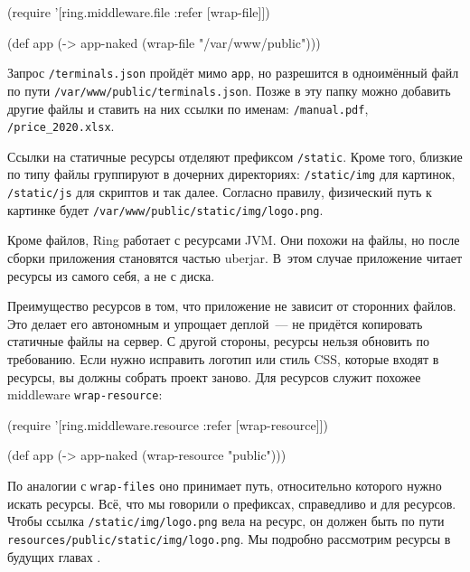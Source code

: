 \else

\begin{english}
  \begin{clojure}
(require '[ring.middleware.file :refer [wrap-file]])

(def app (-> app-naked
             (wrap-file "/var/www/public")))
  \end{clojure}
\end{english}

\fi

Запрос \verb|/terminals.json| пройдёт мимо \verb|app|, но разрешится в
одноимённый файл по пути \verb|/var/www/public/terminals.json|. Позже в эту
папку можно добавить другие файлы и ставить на них ссылки по именам:
\verb|/manual.pdf|, \verb|/price_2020.xlsx|.

Ссылки на статичные ресурсы отделяют префиксом \verb|/static|. Кроме того,
близкие по типу файлы группируют в дочерних директориях: \verb|/static/img| для
картинок, \verb|/static/js| для скриптов и так далее. Согласно правилу,
физический путь к картинке будет \texttt{/var/\-www/\-public/\-static/\-img/\-logo.png}.

Кроме файлов, Ring работает с ресурсами JVM. Они похожи на файлы, но после
сборки приложения становятся частью uberjar. В~этом случае приложение читает
ресурсы из самого себя, а не с диска.

Преимущество ресурсов в том, что приложение не зависит от сторонних файлов. Это
делает его автономным и упрощает деплой~--- не придётся копировать статичные
файлы на сервер. С другой стороны, ресурсы нельзя обновить по требованию. Если
нужно исправить логотип или стиль CSS, которые входят в ресурсы, вы должны
собрать проект заново. Для ресурсов служит похожее middleware
\verb|wrap-resource|:


\begin{english}
  \begin{clojure}
(require '[ring.middleware.resource
           :refer [wrap-resource]])

(def app (-> app-naked
             (wrap-resource "public")))
  \end{clojure}
\end{english}

По аналогии с \verb|wrap-files| оно принимает путь, относительно которого нужно
искать ресурсы. Всё, что мы говорили о префиксах, справедливо и для
ресурсов. Чтобы ссылка \texttt{/static/\-img/\-logo.png} вела на ресурс, он должен
быть по пути \texttt{resources/\-pub\-lic/\-static/\-img/logo.png}. Мы подробно рассмотрим
ресурсы в будущих главах .

